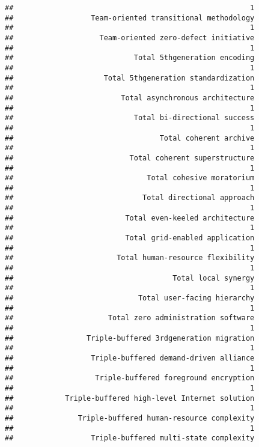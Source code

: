 \documentclass[
]{article}
\begin{document}
\begin{verbatim}
##                                                       1 
##                  Team-oriented transitional methodology 
##                                                       1 
##                    Team-oriented zero-defect initiative 
##                                                       1 
##                            Total 5thgeneration encoding 
##                                                       1 
##                     Total 5thgeneration standardization 
##                                                       1 
##                         Total asynchronous architecture 
##                                                       1 
##                            Total bi-directional success 
##                                                       1 
##                                  Total coherent archive 
##                                                       1 
##                           Total coherent superstructure 
##                                                       1 
##                               Total cohesive moratorium 
##                                                       1 
##                              Total directional approach 
##                                                       1 
##                          Total even-keeled architecture 
##                                                       1 
##                          Total grid-enabled application 
##                                                       1 
##                        Total human-resource flexibility 
##                                                       1 
##                                     Total local synergy 
##                                                       1 
##                             Total user-facing hierarchy 
##                                                       1 
##                      Total zero administration software 
##                                                       1 
##                 Triple-buffered 3rdgeneration migration 
##                                                       1 
##                  Triple-buffered demand-driven alliance 
##                                                       1 
##                   Triple-buffered foreground encryption 
##                                                       1 
##            Triple-buffered high-level Internet solution 
##                                                       1 
##               Triple-buffered human-resource complexity 
##                                                       1 
##                  Triple-buffered multi-state complexity 

\end{verbatim}
\end{document}
